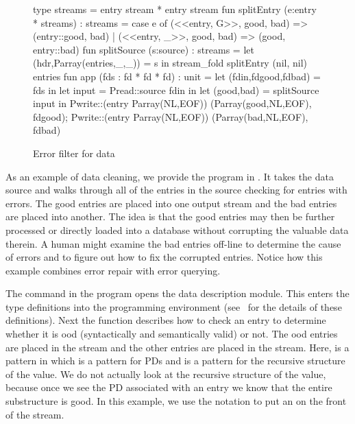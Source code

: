 \documentclass{entcs}
\begin{document}
\begin{figure}
\begin{code}
type streams = entry stream * entry stream
\mbox{}
fun splitEntry (e:entry * streams) : streams =
  case e of
    (<<entry, G>>, good, bad) => (entry::good, bad)
  | (<<entry, _>>, good, bad) => (good, entry::bad)
\mbox{}    
fun splitSource (s:source) : streams =
    let (hdr,Parray(entries,_,_)) = s in 
    stream\_fold splitEntry (nil, nil) entries
\mbox{}
fun app (fds : fd * fd * fd) : unit =  
  let (fdin,fdgood,fdbad) = fds                in
  let input               = Pread::source fdin in
  let (good,bad)          = splitSource input  in
  Pwrite::(entry Parray(NL,EOF)) (Parray(good,NL,EOF), fdgood);
  Pwrite::(entry Parray(NL,EOF)) (Parray(bad,NL,EOF), fdbad)
\end{code}
\caption{Error filter for \dibbler{} data}
\label{figure:ex-data-clean}
\end{figure}

As an example of data cleaning, we provide the program in
.  It takes the \dibbler{} data source and
walks through all of the entries in the source checking for entries
with errors.  The good entries are placed into one output stream and
the bad entries are placed into another.  The idea is that the good
entries may then be further processed or directly loaded into a
database without corrupting the valuable data therein.  A human might
examine the bad entries off-line to determine the cause of errors and
to figure out how to fix the corrupted entries. Notice how this
example combines error repair with error querying.

The command in the program opens the \dibbler{} data description
module.  This enters the type definitions into the programming
environment (see~ for the details of these
definitions).  Next the  function describes how to
check an entry to determine whether it is ood (syntactically and
semantically valid) or not.  The ood entries are placed in the
 stream and the other entries are placed in the 
stream.  Here,  is a pattern in which  is
a pattern for PDs and  is a pattern for the recursive
structure of the value.  We do not actually look at the recursive
structure of the value, because once we see the  PD associated
with an entry we know that the entire substructure is good.  In this
example, we use the notation  to put an  on
the front of the  stream.
\end{document}
